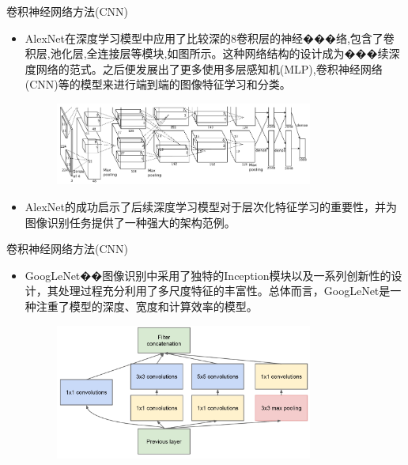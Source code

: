 \documentclass[UTF8,AutoFakeBold,AutoFakeSlant]{beamer}
\begin{document}
\begin{frame}{卷积神经网络方法(CNN)}
    \scriptsize
    \begin{itemize}
        \item AlexNet在深度学习模型中应用了比较深的8卷积层的神经���络,包含了卷积层,池化层,全连接层等模块,如图所示。这种网络结构的设计成为���续深度网络的范式。之后便发展出了更多使用多层感知机(MLP),卷积神经网络(CNN)等的模型来进行端到端的图像特征学习和分类。

              \begin{figure}[H]
                  \centering
                  \includegraphics[width=0.8\textwidth]{img/2-Image Recognition/4.jpg}
              \end{figure}

        \item AlexNet的成功启示了后续深度学习模型对于层次化特征学习的重要性，并为图像识别任务提供了一种强大的架构范例。
    \end{itemize}
\end{frame}

\begin{frame}{卷积神经网络方法(CNN)}
    \scriptsize
    \begin{itemize}
        \item GoogLeNet��图像识别中采用了独特的Inception模块以及一系列创新性的设计，其处理过程充分利用了多尺度特征的丰富性。总体而言，GoogLeNet是一种注重了模型的深度、宽度和计算效率的模型。

              \begin{figure}[H]
                  \centering
                  \includegraphics[width=0.8\textwidth]{img/2-Image Recognition/5.jpg}
              \end{figure}
    \end{itemize}
\end{frame}
\end{document}
